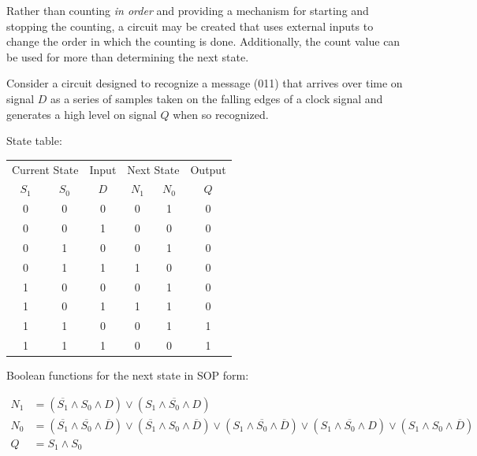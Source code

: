 \documentclass[10pt,letterpaper]{article}
\begin{document}
Rather than counting {\em in order} and providing a mechanism for starting and
stopping the counting, a circuit may be created that uses external inputs
to change the order in which the counting is done.  Additionally, the
count value can be used for more than determining the next state.

Consider a circuit designed to recognize a message (011) that arrives over 
time on signal $D$ as a series of samples taken on the falling edges of a 
clock signal and generates a high level on signal $Q$ when so recognized.

State table:

\begin{center}
\begin{tabular}{|cc|c||cc|c|}
\hline
\multicolumn{2}{|c|}{Current State} & Input & \multicolumn{2}{|c|}{Next State} & Output \\
$S_1$ & $S_0$ & $D$ & $N_1$ & $N_0$ & $Q$ \\
\hline
\hline
0 & 0 &  0  & 0 & 1 &  0\\
0 & 0 &  1  & 0 & 0 &  0\\
0 & 1 &  0  & 0 & 1 &  0\\
0 & 1 &  1  & 1 & 0 &  0\\
1 & 0 &  0  & 0 & 1 &  0\\
1 & 0 &  1  & 1 & 1 &  0\\
1 & 1 &  0  & 0 & 1 &  1\\
1 & 1 &  1  & 0 & 0 &  1\\
\hline
\end{tabular}
\end{center}

Boolean functions for the next state in SOP form:

\begin{align}
N_1	& = (\overline{S_1} \land S_0 \land D) \lor
		(S_1 \land \overline{S_0} \land D) \\
N_0	& = (\overline{S_1} \land \overline{S_0} \land \overline{D}) \lor
		(\overline{S_1} \land S_0 \land \overline{D}) \lor
		(S_1 \land \overline{S_0} \land \overline{D}) \lor
		(S_1 \land \overline{S_0} \land D) \lor
		(S_1 \land S_0 \land \overline{D})\\
Q &= S_1 \land S_0
\end{align}
\end{document}
